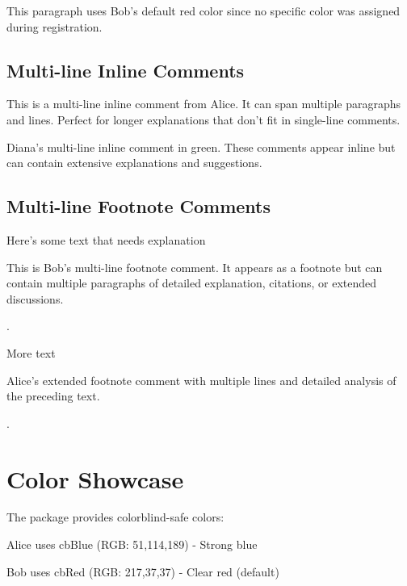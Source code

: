 \documentclass{article}
\begin{document}
\begin{bobenv}
    This paragraph uses Bob's default red color since no specific color was assigned during registration.
\end{bobenv}

\subsection{Multi-line Inline Comments}

\begin{aliceienv}
    This is a multi-line inline comment from Alice.
    It can span multiple paragraphs and lines.
    Perfect for longer explanations that don't fit in single-line comments.
\end{aliceienv}

\begin{dianaienv}
    Diana's multi-line inline comment in green.
    These comments appear inline but can contain
    extensive explanations and suggestions.
\end{dianaienv}

\subsection{Multi-line Footnote Comments}

Here's some text that needs explanation\begin{bobfenv}
    This is Bob's multi-line footnote comment.
    It appears as a footnote but can contain
    multiple paragraphs of detailed explanation,
    citations, or extended discussions.
\end{bobfenv}.

More text\begin{alicefenv}
    Alice's extended footnote comment
    with multiple lines and detailed
    analysis of the preceding text.
\end{alicefenv}.

\section{Color Showcase}

The package provides colorblind-safe colors:

\begin{aliceenv}
    Alice uses cbBlue (RGB: 51,114,189) - Strong blue
\end{aliceenv}

\begin{bobenv}
    Bob uses cbRed (RGB: 217,37,37) - Clear red (default)
\end{bobenv}
\end{document}

